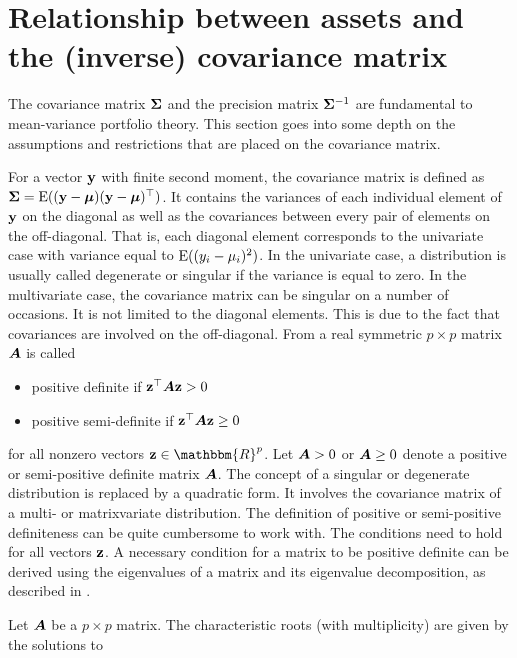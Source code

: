 \documentclass[12pt, oneside]{book}\usepackage{knitr}
\begin{document}
{\section{Relationship between assets and the (inverse) covariance matrix}\label{sec:cov_prec_matrix}
The covariance matrix $\mathbf{\Sigma}$ and the precision matrix $\mathbf{\Sigma}^{-1}$ are fundamental to mean-variance portfolio theory. 
This section goes into some depth on the assumptions and restrictions that are placed on the covariance matrix.

For a vector $\mathbf{y}$ with finite second moment, the covariance matrix is defined as $\mathbf{\Sigma}=\operatorname{E}((\mathbf{y} - \mbox{\boldmath$\mu$})(\mathbf{y} - \mbox{\boldmath$\mu$})^\top)$. 
It contains the variances of each individual element of $\mathbf{y}$ on the diagonal as well as the covariances between every pair of elements on the off-diagonal. 
That is, each diagonal element corresponds to the univariate case with variance equal to $\operatorname{E}((y_i - \mu_i)^2)$. 
In the univariate case, a distribution is usually called degenerate or singular if the variance is equal to zero. 
In the multivariate case, the covariance matrix can be singular on a number of occasions. 
It is not limited to the diagonal elements.
This is due to the fact that covariances are involved on the off-diagonal.
From \citet[ch 14.2]{harville1997matrix} a real symmetric $p\times p$ matrix $\mbox{\boldmath$A$}$ is called 
\begin{itemize}
	\item positive definite if $\mathbf{z}^\top \mbox{\boldmath$A$} \mathbf{z} > 0$
	\item positive semi-definite if $\mathbf{z}^\top \mbox{\boldmath$A$} \mathbf{z} \geq 0$
\end{itemize}
for all nonzero vectors $\bz \in \mathbbm{R}^p$.
Let $\mbox{\boldmath$A$} > 0$ or $\mbox{\boldmath$A$} \geq 0$ denote a positive or semi-positive definite matrix $\mbox{\boldmath$A$}$. 
The concept of a singular or degenerate distribution is replaced by a quadratic form.
It involves the covariance matrix of a multi- or matrixvariate distribution.
The definition of positive or semi-positive definiteness can be quite cumbersome to work with. 
The conditions need to hold for all vectors $\mathbf{z}$. 
A necessary condition for a matrix to be positive definite can be derived using the eigenvalues of a matrix and its eigenvalue decomposition, as described in \citet[ch. 21]{harville1997matrix}.
\begin{definition}\label{def:eigenvalue} 
	Let $\mbox{\boldmath$A$}$ be a $p\times p$ matrix. The characteristic roots (with multiplicity) are given by the solutions to

\end{definition}}
\end{document}
